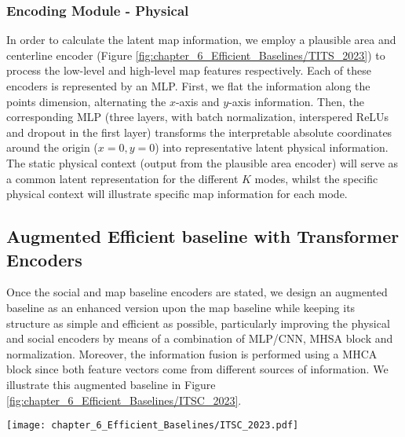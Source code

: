 \subsubsection{Encoding Module - Physical}
\label{subsubsec:6_efficient_baselines_encoding_map}

In order to calculate the latent map information, we employ a plausible area and centerline encoder (Figure \ref{fig:chapter_6_Efficient_Baselines/TITS_2023}) to process the low-level and high-level map features respectively. Each of these encoders is represented by an \ac{MLP}. First, we flat the information along the points dimension, alternating the $x$-axis and $y$-axis information. Then, the corresponding \ac{MLP} (three layers, with batch normalization, interspered \acp{ReLU} and dropout in the first layer) transforms the interpretable absolute coordinates around the origin ($x=0, y=0$) into representative latent physical information. The static physical context (output from the plausible area encoder) will serve as a common latent representation for the different $K$ modes, whilst the specific physical context will illustrate specific map information for each mode.

\subsection{Augmented Efficient baseline with Transformer Encoders}
\label{subsec:6_augmented_baseline}

Once the social and map baseline encoders are stated, we design an augmented baseline as an enhanced version upon the map baseline while keeping its structure as simple and efficient as possible, particularly improving the physical and social encoders by means of a combination of \ac{MLP}/\ac{CNN}, \ac{MHSA} block and normalization. Moreover, the information fusion is performed using a \ac{MHCA} block since both feature vectors come from different sources of information. We illustrate this augmented baseline in Figure \ref{fig:chapter_6_Efficient_Baselines/ITSC_2023}.

\begin{figure*}[!ht]
	\centering
	\setlength{\tabcolsep}{2.0pt}
	\texttt{[image: chapter\_6\_Efficient\_Baselines/ITSC\_2023.pdf]}
	\caption{Augmented baseline with attention-based encoders and information fusion via cross-attention}	
	\label{fig:chapter_6_Efficient_Baselines/ITSC_2023}
\end{figure*}

